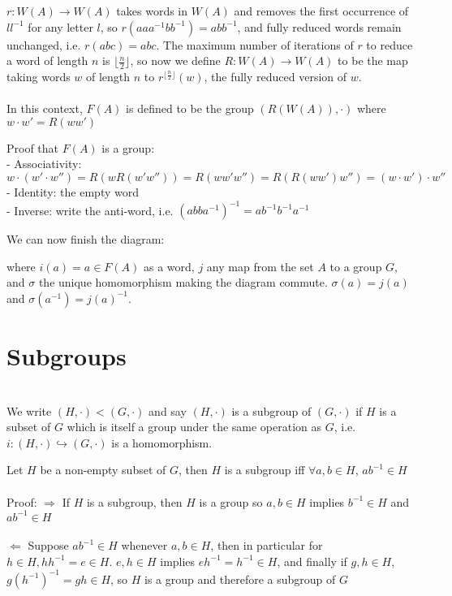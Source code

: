 \documentclass{amsart}
\begin{document}
\begin{definition}
    $r:W(A)\to W(A)$ takes words in $W(A)$ and removes the first occurrence of $ll^{-1}$ for any letter $l$, so $r(aaa^{-1}bb^{-1})=abb^{-1}$, and fully reduced words remain unchanged, i.e. $r(abc)=abc$. The maximum number of iterations of $r$ to reduce a word of length $n$ is $\lfloor \frac{n}{2}\rfloor$, so now we define $R:W(A)\to W(A)$ to be the map taking words $w$ of length $n$ to $r^{\lfloor \frac{n}{2}\rfloor}(w)$, the fully reduced version of $w$.
    \\
    \\
    In this context, $F(A)$ is defined to be the group $(R(W(A)), \cdot)$ where $w\cdot w' = R(ww')$
\end{definition}
Proof that $F(A)$ is a group:\\
- Associativity: $w\cdot (w'\cdot w'')=R(wR(w'w''))=R(ww'w'')=R(R(ww')w'')=(w\cdot w')\cdot w''$\\
- Identity: the empty word\\
- Inverse: write the anti-word, i.e. $(abba^{-1})^{-1}=ab^{-1}b^{-1}a^{-1}$
\pagebreak

We can now finish the diagram:
\begin{center}
\end{center}
where $i(a)=a\in F(A)$ as a word, $j$ any map from the set $A$ to a group $G$, and $\sigma$ the unique homomorphism making the diagram commute. $\sigma(a) = j(a)$ and $\sigma(a^{-1})=j(a)^{-1}$.
\\
\section{\textbf{Subgroups}}
\hfill
\\
We write $(H,\cdot)<(G,\cdot)$ and say $(H,\cdot)$ is a subgroup of $(G,\cdot)$ if $H$ is a subset of $G$ which is itself a group under the same operation as $G$, i.e. $i: (H,\cdot)\hookrightarrow{} (G,\cdot)$ is a homomorphism.
\begin{lemma}
    Let $H$ be a non-empty subset of $G$, then $H$ is a subgroup iff $\forall a,b\in H$, $ab^{-1}\in H$\\
    \\
    Proof: $\Rightarrow$ If $H$ is a subgroup, then $H$ is a group so $a,b\in H$ implies $b^{-1}\in H$ and $ab^{-1}\in H$\\
    \\
    $\Leftarrow$ Suppose $ab^{-1}\in H$ whenever $a,b\in H$, then in particular for $h\in H, hh^{-1}=e\in H$. $e,h\in H$ implies $eh^{-1}=h^{-1}\in H$, and finally if $g,h\in H$, $g(h^{-1})^{-1}=gh\in H$, so $H$ is a group and therefore a subgroup of $G$
\end{lemma}
\hfill
\end{document}
